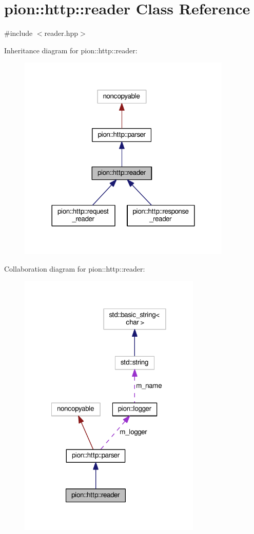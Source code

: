 \hypertarget{classpion_1_1http_1_1reader}{\section{pion\-:\-:http\-:\-:reader Class Reference}
\label{classpion_1_1http_1_1reader}
}


{\ttfamily \#include $<$reader.\-hpp$>$}



Inheritance diagram for pion\-:\-:http\-:\-:reader\-:
\nopagebreak
\begin{figure}[H]
\begin{center}
\leavevmode
\includegraphics[width=288pt]{classpion_1_1http_1_1reader__inherit__graph}
\end{center}
\end{figure}


Collaboration diagram for pion\-:\-:http\-:\-:reader\-:
\nopagebreak
\begin{figure}[H]
\begin{center}
\leavevmode
\includegraphics[width=246pt]{classpion_1_1http_1_1reader__coll__graph}
\end{center}
\end{figure}
